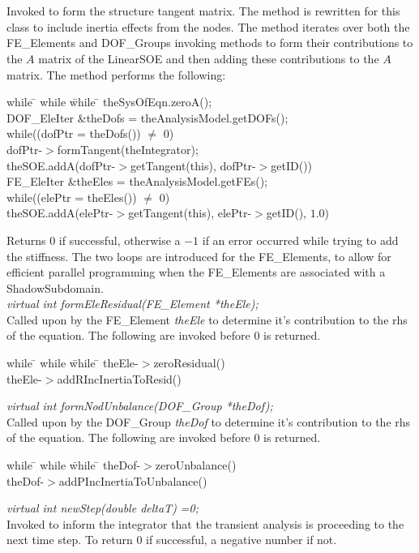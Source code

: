 \\
 \\
Invoked to form the structure tangent matrix. The method is rewritten
for this class to include inertia effects from the nodes. The method
iterates over both the FE\_Elements and DOF\_Groups invoking methods
to form their contributions to the $A$ matrix of the LinearSOE and
then adding these contributions to the $A$ matrix. The method performs
the following:
\begin{tabbing}
while \= \+ while \= while \= \kill
theSysOfEqn.zeroA();\\
DOF\_EleIter \&theDofs = theAnalysisModel.getDOFs();\\
while((dofPtr = theDofs()) $\neq$ 0) \+ \\
dofPtr-$>$formTangent(theIntegrator); \\
theSOE.addA(dofPtr-$>$getTangent(this),
dofPtr-$>$getID()) \- \\
FE\_EleIter \&theEles = theAnalysisModel.getFEs();\\
while((elePtr = theEles()) $\neq$ 0) \+ \\
theSOE.addA(elePtr-$>$getTangent(this),
elePtr-$>$getID(), $1.0$) \\
\end{tabbing}
\noindent Returns $0$ if successful, otherwise a $-1$ if an error occurred while
trying to add the stiffness. The two loops are introduced for the
FE\_Elements, to allow for efficient parallel programming when the
FE\_Elements are associated with a ShadowSubdomain.\\ 

{\em virtual int formEleResidual(FE\_Element *theEle);} \\
Called upon by the FE\_Element {\em theEle} to determine it's
contribution to the rhs of the equation. The following are invoked
before $0$ is returned.
\begin{tabbing}
while \= \+ while \= while \= \kill
theEle-$>$zeroResidual() \\
theEle-$>$addRIncInertiaToResid() \\
\end{tabbing}

{\em virtual int formNodUnbalance(DOF\_Group *theDof);} \\
Called upon by the DOF\_Group {\em theDof} to determine it's
contribution to the rhs of the equation. The following are invoked
before $0$ is returned.
\begin{tabbing}
while \= \+ while \= while \= \kill
theDof-$>$zeroUnbalance() \\
theDof-$>$addPIncInertiaToUnbalance() \\
\end{tabbing}

{\em virtual int newStep(double deltaT) =0;} \\
Invoked to inform the integrator that the transient analysis is
proceeding to the next time step. To return $0$ if successful, a
negative number if not.\\





